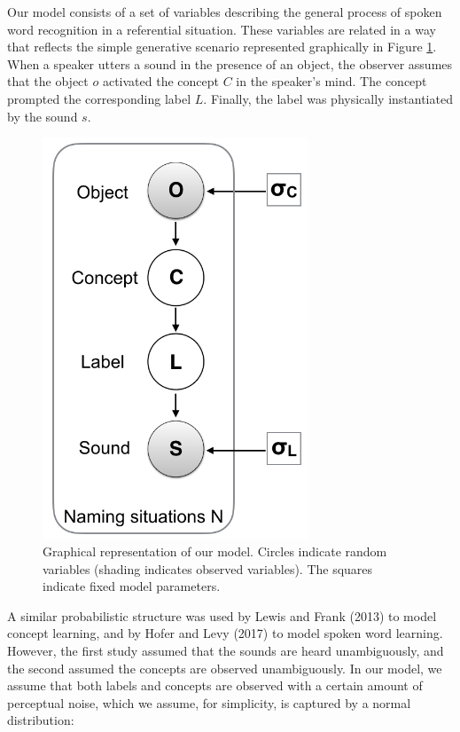 \documentclass[english,,man,floatsintext]{apa6}
\theoremstyle{definition}
\theoremstyle{definition}
\theoremstyle{definition}
\theoremstyle{remark}
\begin{document}
Our model consists of a set of variables describing the general process
of spoken word recognition in a referential situation. These variables
are related in a way that reflects the simple generative scenario
represented graphically in Figure \ref{fig:model}. When a speaker utters
a sound in the presence of an object, the observer assumes that the
object \(o\) activated the concept \(C\) in the speaker's mind. The
concept prompted the corresponding label \(L\). Finally, the label was
physically instantiated by the sound \(s\).

\begin{figure}

{\centering \includegraphics[width=300px]{figs/model} 

}

\caption{Graphical representation of our model. Circles indicate random variables (shading indicates observed variables). The squares indicate fixed model parameters.}\label{fig:model}
\end{figure}

A similar probabilistic structure was used by Lewis and Frank (2013) to
model concept learning, and by Hofer and Levy (2017) to model spoken
word learning. However, the first study assumed that the sounds are
heard unambiguously, and the second assumed the concepts are observed
unambiguously. In our model, we assume that both labels and concepts are
observed with a certain amount of perceptual noise, which we assume, for
simplicity, is captured by a normal distribution:
\end{document}
